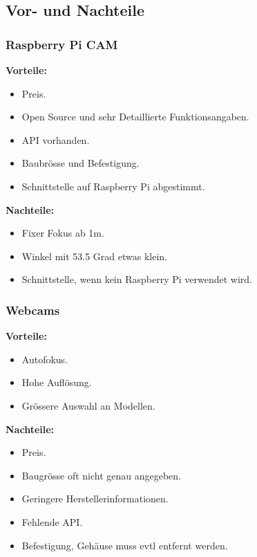 \subsection{Vor- und Nachteile}
\subsubsection{Raspberry Pi CAM}
\textbf{Vorteile:}
\begin{itemize}
\item Preis.
\item Open Source und sehr Detaillierte Funktionsangaben.
\item API vorhanden.
\item Baubrösse und Befestigung.
\item Schnittstelle auf Raspberry Pi abgestimmt.
\end{itemize}
\textbf{Nachteile:}
\begin{itemize}
\item Fixer Fokus ab 1m.
\item Winkel mit 53.5 Grad etwas klein.
\item Schnittstelle, wenn kein Raspberry Pi verwendet wird.
\end{itemize}
\subsubsection{Webcams}
\textbf{Vorteile:}
\begin{itemize}
\item Autofokus.
\item Hohe Auflösung.
\item Grössere Auswahl an Modellen.
\end{itemize}
\textbf{Nachteile:}
\begin{itemize}
\item Preis.
\item Baugrösse oft nicht genau angegeben.
\item Geringere Herstellerinformationen.
\item Fehlende API.
\item Befestigung, Gehäuse muss evtl entfernt werden.
\end{itemize}